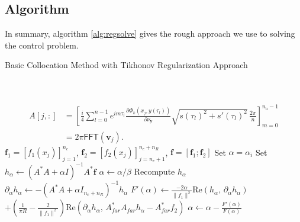 \documentclass[11pt]{amsart}
\theoremstyle{definition}
\theoremstyle{definition}
\theoremstyle{definition}
\newcommand{\paren}[1]{\left ( #1\right )}
\newcommand{\re}{\textrm{Re}}
\begin{document}
\subsection{Algorithm}
In summary, algorithm \ref{alg:regsolve} gives the rough approach we use to solving the control problem.
\begin{algorithm}
\caption{Basic Collocation Method with Tikhonov Regularization Approach}
\label{alg:regsolve}
\begin{algorithmic}[]
	\\\\

		\State \begin{align*}
A[j, :] & = \left[ \frac{i}{4}\sum_{l=0}^{n-1}e^{im \tau_{l}}\frac{\partial \Phi_{k}(x_{j}, y(\tau_{l}))}{\partial \nu_{\mathbf{y}}} \sqrt{s(\tau_{l})^{2} + s'(\tau_{l})^{2}}\,\frac{2\pi}{n} \right]_{m=0}^{n_{a}-1}\\
& = 2\pi \mathsf{FFT}(\mathbf{v}_{j}).
\end{align*}
	\EndFor
	\State $\mathbf{f}_{1} = [f_{1}(x_{j})]_{j=1}^{n_{c}}$, $\mathbf{f}_{2} = [f_{2}(x_{j})]_{j=n_{c}+1}^{n_{c}+n_{R}}$, $\mathbf{f} = [\mathbf{f}_{1}; \mathbf{f}_{2}]$
	\State Set $\alpha = \alpha_{i}$
	\State Set $h_{\alpha} \leftarrow (A^{*}A + \alpha I)^{-1}A^{*}\mathbf{f}$
		\State $\alpha \leftarrow \alpha/\beta$
		\State Recompute $h_{\alpha}$
	\EndWhile
	\\
			\State $\partial_{\alpha} h_{\alpha} \leftarrow -(A^{*}A + \alpha I_{n_{c} + n_{R}})^{-1}h_{\alpha}$
			\State $F'(\alpha) \leftarrow \frac{-2 \alpha}{\|f_{1}\|^{2}} \re\paren{ h_{\alpha}, \, \partial_{\alpha}h_{\alpha}}$\\
			\State \qquad \qquad $ + \paren{\frac{1}{\pi R} - \frac{2}{\|f_{1}\|^{2}}}\re\paren{ \partial_{\alpha}h_{\alpha},\, A_{far}^{*}A_{far}h_{\alpha} - A_{far}^{*}f_{2}}$
			\State $\alpha \leftarrow \alpha - \frac{F'(\alpha)}{F(\alpha)}$
		\EndWhile
	\EndIf
	
\end{algorithmic}
\end{algorithm}
\end{document}
